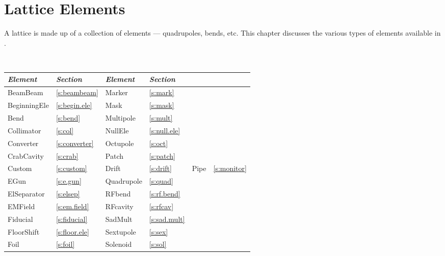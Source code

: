 \chapter{Lattice Elements}
\label{c:elements}


A lattice is made up of a collection of elements --- quadrupoles,
bends, etc. This chapter discusses the various types of elements
available in \bmad.

\begin{table}[htb]
\centering
{\tt
\begin{tabular}{llll} \toprule
  {\it Element}    & {\it Section}         & {\it Element}      & {\it Section}       \\ \midrule
  BeamBeam         & \ref{s:beambeam}      &  Marker            & \ref{s:mark}        \\ 
  BeginningEle     & \ref{s:begin.ele}     &  Mask              & \ref{s:mask}        \\
  Bend             & \ref{s:bend}          &  Multipole         & \ref{s:mult}        \\
  Collimator       & \ref{s:col}           &  NullEle           & \ref{s:null.ele}    \\
  Converter        & \ref{s:converter}     &  Octupole          & \ref{s:oct}         \\
  CrabCavity       & \ref{s:crab}          &  Patch             & \ref{s:patch}       \\
  Custom           & \ref{s:custom}        &  
  Drift            & \ref{s:drift}         &  Pipe              & \ref{s:monitor}     \\
  EGun             & \ref{s:e.gun}         &  Quadrupole        & \ref{s:quad}        \\
  ElSeparator      & \ref{s:elsep}         &  RFbend            & \ref{s:rf.bend}     \\
  EMField          & \ref{s:em.field}      &  RFcavity          & \ref{s:rfcav}       \\ 
  Fiducial         & \ref{s:fiducial}      &  SadMult           & \ref{s:sad.mult}    \\
  FloorShift       & \ref{s:floor.ele}     &  Sextupole         & \ref{s:sex}         \\
  Foil             & \ref{s:foil}          &  Solenoid          & \ref{s:sol}         \\

\end{tabular}}
\end{table}

